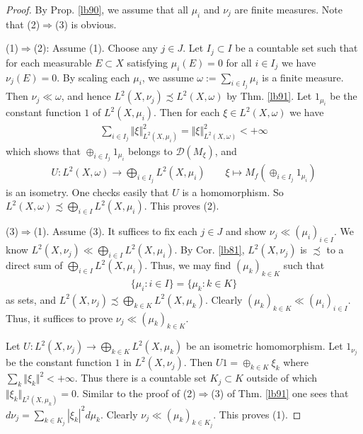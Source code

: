 \documentclass[12pt,b5paper,notitlepage]{article}
\theoremstyle{definition}
\theoremstyle{plain}
\newcommand{\Dom}{\scr D}
\newcommand{\scr}{\mathscr}
\numberwithin{equation}{section}
\begin{document}
\begin{proof}
By Prop. \ref{lb90}, we assume that all $\mu_i$ and $\nu_j$ are finite measures. Note that (2)$\Rightarrow$(3) is obvious.

(1)$\Rightarrow$(2): Assume (1). Choose any $j\in J$. Let $I_j\subset I$ be a countable set such that for each measurable $E\subset X$ satisfying $\mu_i(E)=0$ for all $i\in I_j$ we have $\nu_j(E)=0$. By scaling each $\mu_i$, we assume $\omega:=\sum_{i\in I_j}\mu_i$ is a finite measure. Then $\nu_j\ll\omega$, and hence $L^2(X,\nu_j)\precsim L^2(X,\omega)$ by Thm. \ref{lb91}. Let $1_{\mu_i}$ be the constant function $1$ of $L^2(X,\mu_i)$. Then for each $\xi\in L^2(X,\omega)$ we have
\begin{align*}
\sum_{i\in I_j}\Vert\xi\Vert_{L^2(X,\mu_i)}^2=\Vert \xi\Vert_{L^2(X,\omega)}^2<+\infty
\end{align*}
which shows that $\oplus_{i\in I_j}1_{\mu_i}$ belongs to $\Dom(M_\xi)$, and
\begin{align*}
U:L^2(X,\omega)\rightarrow \bigoplus_{i\in I_j}L^2(X,\mu_i)\qquad \xi\mapsto M_f(\oplus_{i\in I_j}1_{\mu_i})
\end{align*}
is an isometry. One checks easily that $U$ is a homomorphism. So $L^2(X,\omega)\precsim\bigoplus_{i\in I}L^2(X,\mu_i)$. This proves (2).

(3)$\Rightarrow$(1). Assume (3). It suffices to fix each $j\in J$ and show $\nu_j\ll(\mu_i)_{i\in I}$. We know $L^2(X,\nu_j)\ll \bigoplus_{i\in I}L^2(X,\mu_i)$. By Cor. \ref{lb81}, $L^2(X,\nu_j)$ is $\precsim$ to a direct sum of $\bigoplus_{i\in I}L^2(X,\mu_i)$. Thus, we may find $(\mu_k)_{k\in K}$ such that
\begin{align*}
\{\mu_i:i\in I\}=\{\mu_k:k\in K\}
\end{align*}
as sets, and $L^2(X,\nu_j)\precsim \bigoplus_{k\in K}L^2(X,\mu_k)$. Clearly $(\mu_k)_{k\in K}\ll(\mu_i)_{i\in I}$. Thus, it suffices to prove $\nu_j\ll(\mu_k)_{k\in K}$.

Let $U:L^2(X,\nu_j)\rightarrow\bigoplus_{k\in K}L^2(X,\mu_k)$ be an isometric homomorphism. Let $1_{\nu_j}$ be the constant function $1$ in $L^2(X,\nu_j)$. Then $U1=\oplus_{k\in K}\xi_k$ where $\sum_k\Vert\xi_k\Vert^2<+\infty$. Thus there is a countable set $K_j\subset K$ outside of which $\Vert\xi_k\Vert_{L^2(X,\mu_k)}=0$. Similar to the proof of (2)$\Rightarrow$(3) of Thm. \ref{lb91} one sees that $d\nu_j=\sum_{k\in K_j}|\xi_k|^2d\mu_k$. Clearly $\nu_j\ll(\mu_k)_{k\in K_j}$. This proves (1).
\end{proof}
\end{document}
